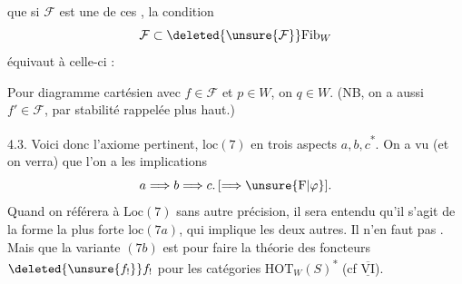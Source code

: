 que si $\mathcal F$ est une de ces  , la
condition
\[
\mathcal F\subset\deleted{\unsure{\mathcal F}}\mathrm{Fib}_W
\]
équivaut à celle-ci :

Pour  diagramme cartésien
avec $f\in\mathcal F$ et $p\in W$, on  $q\in W$. (NB, on
a aussi $f'\in\mathcal F$, par  stabilité rappelée plus haut.)

4.3. Voici donc  l'axiome pertinent, $\mathrm{loc}(7)$
 en trois aspects $a,b,c$\textsuperscript{*}. On
a vu (et on verra) que l'on a les
implications
\[
a\Longrightarrow b\Longrightarrow c.\,[\Longrightarrow\unsure{\mathrm F|\varphi}].
\]
Quand on référera à $\mathrm{Loc}(7)$ sans autre précision,
il sera entendu qu'il s'agit de la
forme la plus forte $\mathrm{loc}(7a)$, qui implique
les deux autres. Il n'en faut pas
 . Mais
 que la variante   $(7b)$ est
 pour faire la théorie des foncteurs
$\deleted{\unsure{f_!}} f_!$ pour les catégories $\mathrm{HOT}_W(S)$\textsuperscript{*} (cf $\overline{\underline{\mathrm{VI}}}$).
